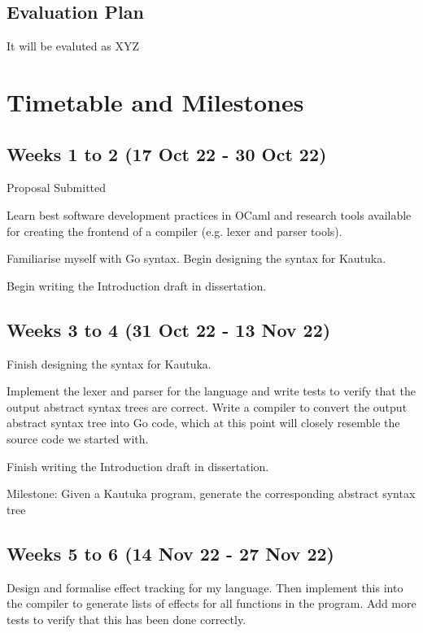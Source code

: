 \documentclass[12pt,a4paper,twoside]{article}
\begin{document}
\subsection{Evaluation Plan}

It will be evaluted as XYZ


\newpage 


\section{Timetable and Milestones}

\subsection*{Weeks 1 to 2 (17 Oct 22 - 30 Oct 22)}
Proposal Submitted

Learn best software development practices in OCaml and research tools available for creating the frontend of a compiler (e.g. lexer and parser tools). 

Familiarise myself with Go syntax. Begin designing the syntax for Kautuka.

Begin writing the Introduction draft in dissertation.

\subsection*{Weeks 3 to 4 (31 Oct 22 - 13 Nov 22)}

Finish designing the syntax for Kautuka. 

Implement the lexer and parser for the language and write tests to verify that the output abstract syntax trees are correct. Write a compiler to convert the output abstract syntax tree into Go code, which at this point will closely resemble the source code we started with. 

Finish writing the Introduction draft in dissertation.

Milestone: Given a Kautuka program, generate the corresponding abstract syntax tree 

\subsection*{Weeks 5 to 6 (14 Nov 22 - 27 Nov 22)}

Design and formalise effect tracking for my language. Then implement this into the compiler to generate lists of effects for all functions in the program. Add more tests to verify that this has been done correctly.
\end{document}
